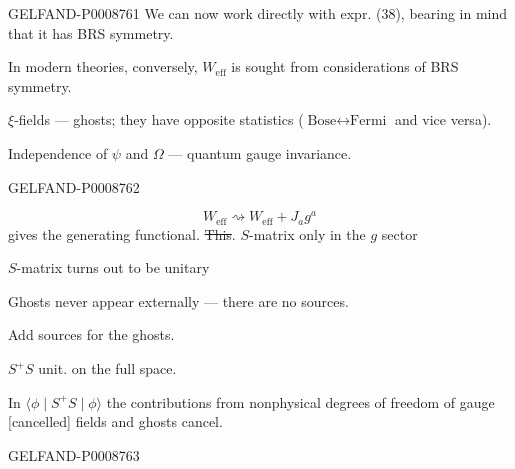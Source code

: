 \begin{GelfandAdjacentEvidence}{GELFAND-P000876}{1}
We can now work directly with expr. (38), bearing in mind that it has BRS symmetry.

In modern theories, conversely, $W_{\mathrm{eff}}$ is sought from considerations of BRS symmetry.

$\xi$-fields --- ghosts; they have opposite statistics ($\text{Bose}\leftrightarrow\text{Fermi}$ and vice versa).

Independence of $\psi$ and $\Omega$ --- quantum gauge invariance.

\end{GelfandAdjacentEvidence}
\begin{GelfandAdjacentEvidence}{GELFAND-P000876}{2}

\begin{equation*}
W_{\mathrm{eff}}\rightsquigarrow W_{\mathrm{eff}}+J_a g^a
\tag{46}
\end{equation*}
gives the generating functional. \sout{This}. $S$-matrix only in the $g$ sector

$S$-matrix turns out to be unitary

Ghosts never appear externally --- there are no sources.

Add sources for the ghosts.

$S^+S$ unit. on the full space.

In $\langle\phi\mid S^+S\mid\phi\rangle$ the contributions from nonphysical degrees of freedom of gauge [cancelled] fields and ghosts cancel.
\end{GelfandAdjacentEvidence}
\begin{GelfandAdjacentEvidence}{GELFAND-P000876}{3}

\end{GelfandAdjacentEvidence}
